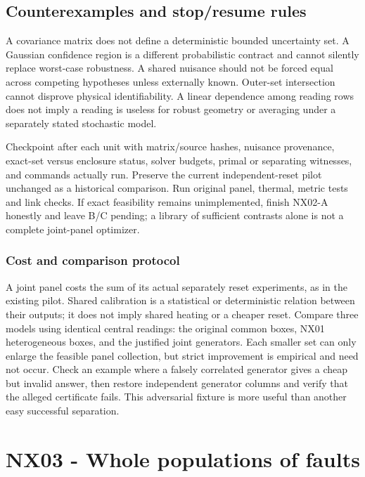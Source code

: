 \documentclass[
  11pt,
  a4paper,
]{report}
\begin{document}
\hypertarget{counterexamples-and-stopresume-rules}{%
\section{Counterexamples and stop/resume
rules}\label{counterexamples-and-stopresume-rules}}

A covariance matrix does not define a deterministic bounded uncertainty
set. A Gaussian confidence region is a different probabilistic contract
and cannot silently replace worst-case robustness. A shared nuisance
should not be forced equal across competing hypotheses unless externally
known. Outer-set intersection cannot disprove physical identifiability.
A linear dependence among reading rows does not imply a reading is
useless for robust geometry or averaging under a separately stated
stochastic model.

Checkpoint after each unit with matrix/source hashes, nuisance
provenance, exact-set versus enclosure status, solver budgets, primal or
separating witnesses, and commands actually run. Preserve the current
independent-reset pilot unchanged as a historical comparison. Run
original panel, thermal, metric tests and link checks. If exact
feasibility remains unimplemented, finish NX02-A honestly and leave B/C
pending; a library of sufficient contrasts alone is not a complete
joint-panel optimizer.

\hypertarget{cost-and-comparison-protocol}{%
\subsection{Cost and comparison
protocol}\label{cost-and-comparison-protocol}}

A joint panel costs the sum of its actual separately reset experiments,
as in the existing pilot. Shared calibration is a statistical or
deterministic relation between their outputs; it does not imply shared
heating or a cheaper reset. Compare three models using identical central
readings: the original common boxes, NX01 heterogeneous boxes, and the
justified joint generators. Each smaller set can only enlarge the
feasible panel collection, but strict improvement is empirical and need
not occur. Check an example where a falsely correlated generator gives a
cheap but invalid answer, then restore independent generator columns and
verify that the alleged certificate fails. This adversarial fixture is
more useful than another easy successful separation.

\hypertarget{nx03---whole-populations-of-faults}{%
\chapter{NX03 - Whole populations of
faults}\label{nx03---whole-populations-of-faults}}
\end{document}
